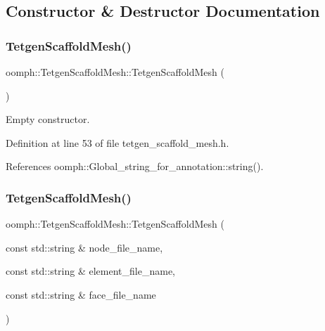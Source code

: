 \subsection{Constructor \& Destructor Documentation}
\mbox{\label{classoomph_1_1TetgenScaffoldMesh_a2262991306aa1fa98463e2bdf85ac518}} 
\subsubsection{\texorpdfstring{Tetgen\+Scaffold\+Mesh()}{TetgenScaffoldMesh()}\hspace{0.1cm}{\footnotesize\ttfamily [1/3]}}
{\footnotesize\ttfamily oomph\+::\+Tetgen\+Scaffold\+Mesh\+::\+Tetgen\+Scaffold\+Mesh (\begin{DoxyParamCaption}{ }\end{DoxyParamCaption})\hspace{0.3cm}{\ttfamily [inline]}}



Empty constructor. 



Definition at line 53 of file tetgen\+\_\+scaffold\+\_\+mesh.\+h.



References oomph\+::\+Global\+\_\+string\+\_\+for\+\_\+annotation\+::string().

\mbox{\label{classoomph_1_1TetgenScaffoldMesh_abeb97f979ddf97f8b7690c9a53082e13}} 
\subsubsection{\texorpdfstring{Tetgen\+Scaffold\+Mesh()}{TetgenScaffoldMesh()}\hspace{0.1cm}{\footnotesize\ttfamily [2/3]}}
{\footnotesize\ttfamily oomph\+::\+Tetgen\+Scaffold\+Mesh\+::\+Tetgen\+Scaffold\+Mesh (\begin{DoxyParamCaption}\item[{const std\+::string \&}]{node\+\_\+file\+\_\+name,  }\item[{const std\+::string \&}]{element\+\_\+file\+\_\+name,  }\item[{const std\+::string \&}]{face\+\_\+file\+\_\+name }\end{DoxyParamCaption})}



